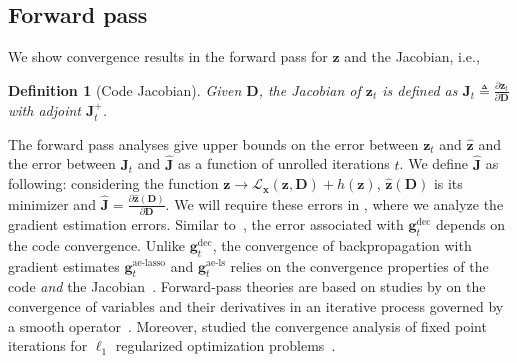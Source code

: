 \documentclass[10pt]{article} %
\newtheorem{definition}{Definition}[section]
\newcommand{\D}{{\bm D}}
\newcommand{\J}{{\bm J}}
\newcommand{\x}{{\bm x}}
\newcommand{\z}{{\bm z}}
\newcommand{\g}{{\bm g}}
\newcommand{\Loss}{\mathcal{L}}
\begin{document}
\subsection{Forward pass}\label{sec:forward}
%
We show convergence results in the forward pass for $\z$ and the Jacobian, i.e.,
%
\begin{definition}[Code Jacobian]\label{def:jacobian}
Given $\D$, the Jacobian of $\z_t$ is defined as $\J_t \triangleq \frac{\partial \z_t}{\partial \D}$ with adjoint $\J_t^+$.
\end{definition}
%
The forward pass analyses give upper bounds on the error between $\z_t$ and $\hat \z$ and the error between $\J_t$ and $\hat \J$ as a function of unrolled iterations $t$. We define $\hat \J$ as following: considering the function $\z \rightarrow \Loss_{\x}(\z, \D) + h(\z)$, $\hat \z(\D)$ is its minimizer and $\hat \J = \frac{\partial \hat \z(\D)}{\partial \D}$. We will require these errors in , where we analyze the gradient estimation errors. Similar to~\citep{chatterji2017alternating}, the error associated with $\g_t^{\text{dec}}$ depends on the code convergence. Unlike $\g_t^{\text{dec}}$, the convergence of backpropagation with gradient estimates $\g_t^{\text{ae-lasso}}$ and $\g_t^{\text{ae-ls}}$ relies on the convergence properties of the code \emph{and} the Jacobian~\citep{ablin2020super}. Forward-pass theories are based on studies by \citet{gilbert1992automatic} on the convergence of variables and their derivatives in an iterative process governed by a smooth operator~\citep{gilbert1992automatic}. Moreover, \citet{hale2007fixed} studied the convergence analysis of fixed point iterations for $\ell_1$ regularized optimization problems~\citep{hale2007fixed}.
%
\end{document}
